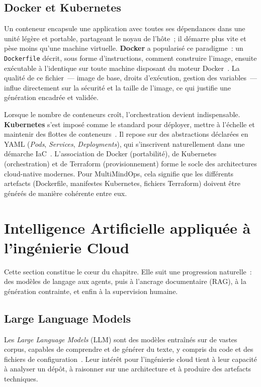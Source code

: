 \subsection{Docker et Kubernetes}

Un conteneur encapsule une application avec toutes ses dépendances dans une unité légère et
portable, partageant le noyau de l'hôte~; il démarre plus vite et pèse moins qu'une machine
virtuelle. \textbf{Docker} a popularisé ce paradigme~: un \texttt{Dockerfile} décrit, sous
forme d'instructions, comment construire l'image, ensuite exécutable à l'identique sur toute
machine disposant du moteur Docker~\cite{DOCKER_DOCS}. La qualité de ce fichier~--- image de
base, droits d'exécution, gestion des variables~--- influe directement sur la sécurité et la
taille de l'image, ce qui justifie une génération encadrée et validée.

Lorsque le nombre de conteneurs croît, l'orchestration devient indispensable.
\textbf{Kubernetes} s'est imposé comme le standard pour déployer, mettre à l'échelle et
maintenir des flottes de conteneurs~\cite{K8S_DOCS}. Il repose sur des abstractions
déclarées en YAML (\textit{Pods}, \textit{Services}, \textit{Deployments}), qui s'inscrivent
naturellement dans une démarche IaC~\cite{CNCF}. L'association de Docker (portabilité), de
Kubernetes (orchestration) et de Terraform (provisionnement) forme le socle des
architectures cloud-native modernes. Pour MultiMindOps, cela signifie que les différents
artefacts (Dockerfile, manifestes Kubernetes, fichiers Terraform) doivent être générés de
manière cohérente entre eux.

\section{Intelligence Artificielle appliquée à l'ingénierie Cloud}

Cette section constitue le c\oe ur du chapitre. Elle suit une progression naturelle~: des
modèles de langage aux agents, puis à l'ancrage documentaire (RAG), à la génération
contrainte, et enfin à la supervision humaine.

\subsection{Large Language Models}

Les \textit{Large Language Models} (LLM) sont des modèles entraînés sur de vastes corpus,
capables de comprendre et de générer du texte, y compris du code et des fichiers de
configuration~\cite{OPENAI_DOCS}. Leur intérêt pour l'ingénierie cloud tient à leur capacité
à analyser un dépôt, à raisonner sur une architecture et à produire des artefacts techniques.

